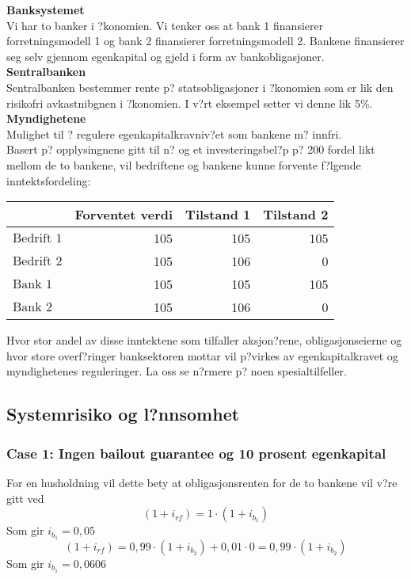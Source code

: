 \documentclass[a4paper,notitlepage]{article}
\begin{document}
\noindent\textbf{Banksystemet}\\
Vi har to banker i ?konomien. Vi tenker oss at bank 1 finansierer forretningsmodell 1 og bank 2 finansierer forretningsmodell 2. Bankene finansierer seg selv gjennom egenkapital og gjeld i form av bankobligasjoner.\\

\noindent\textbf{Sentralbanken}\\
Sentralbanken bestemmer rente p? statsobligasjoner i ?konomien som er lik den risikofri avkastnibgnen i ?konomien. I v?rt eksempel setter vi denne lik 5\%.\\

\noindent\textbf{Myndighetene}\\
Mulighet til ? regulere egenkapitalkravniv?et som bankene m? innfri.\\

Basert p? opplysingnene gitt til n? og et investeringsbel?p p? 200 fordel likt mellom de to bankene, vil bedriftene og bankene kunne forvente f?lgende inntektsfordeling:
\begin{center}
\begin{tabular}{lrrr}
\hline
      & Forventet verdi & Tilstand 1 & Tilstand 2 \\
\hline
$\text{Bedrift 1}$ &       105 & 105 & 105 \\
$\text{Bedrift 2}$ &       105 & 106 & 0 \\
$\text{Bank 1}$    &       105 & 105 & 105 \\
$\text{Bank 2}$    &       105 & 106 & 0 \\

\end{tabular}
\end{center}
Hvor stor andel av disse inntektene som tilfaller aksjon?rene, obligasjonseierne og hvor store overf?ringer banksektoren mottar vil p?virkes av egenkapitalkravet og myndighetenes reguleringer. La oss se n?rmere p? noen spesialtilfeller.
\subsection{Systemrisiko og l?nnsomhet}
\subsubsection{Case 1: Ingen bailout guarantee og 10 prosent egenkapital}
For en husholdning vil dette bety at obligasjonsrenten for de to bankene vil v?re gitt ved
\begin{equation*}
(1+i_{rf})=1\cdot (1+i_{b_{1}})
\end{equation*}
Som gir $i_{b_{1}}=0,05$
\begin{equation*}
(1+i_{rf})=0,99\cdot (1+i_{b_{2}})+0,01\cdot 0=0,99\cdot (1+i_{b_{2}})
\end{equation*}
Som gir $i_{b_{1}}=0,0606$
\end{document}
